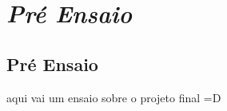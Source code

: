 \chapter{\textit{Pré Ensaio}}
	\label{ch:ensaio}

\section{Pré Ensaio}
aqui vai um ensaio sobre o projeto final =D
